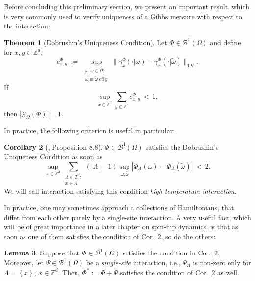 \documentclass[12pt]{article}
\newcommand{\BB}{\mathscr{B}}
\newcommand{\G}{\mathcal{G}}
\newcommand{\Z}{\mathbb{Z}}
\newcommand{\TV}{\mathrm{TV}}
\newcommand{\set}[1]{\left\{#1\right\}}
\newcommand{\pika}{\boldsymbol{\cdot}}
\newcommand{\1}{\mathbbm{1}}
\newcommand{\5}{\vspace{0.5cm}}
\renewcommand{\tilde}{\widetilde}
\theoremstyle{definition}
\newtheorem{thm}{Theorem}[section]
\newtheorem{lem}[thm]{Lemma}
\newtheorem{cor}[thm]{Corollary}
\begin{document}
Before concluding this preliminary section, we present an important result, which is very commonly used to verify uniqueness of a Gibbs measure with respect to the interaction:
\begin{thm}[Dobrushin's Uniqueness Condition]\label{Dobrushin}
Let $\Phi\in\BB^1(\Omega)$ and define for $x,y\in\Z^d$,
$$c_{x,y}^\Phi ~:=~ \sup_{\substack{\omega,\tilde{\omega}\in\Omega:\\\omega\equiv\tilde{\omega}~\text{off}~ y}}\|\gamma_x^\Phi(\pika|\omega)-\gamma_x^\Phi(\pika|\tilde{\omega})\|_\TV.$$
If
$$\sup_{x\in\Z^d}\sum_{y\in\Z^d}c_{x,y}^\Phi ~<~ 1,$$
then $|\G_\Omega(\Phi)|=1$.
\end{thm}

In practice, the following criterion is useful in particular:

\begin{cor}[\cite{Geo}, Proposition 8.8]\label{DobCor}
$\Phi\in\BB^1(\Omega)$ satisfies the Dobrushin's Uniqueness Condition as soon as
$$\sup_{x\in\Z^d}\sum_{\substack{\Lambda\Subset\Z^d:\\x\in\Lambda}}(|\Lambda|-1)\sup_{\omega,\tilde{\omega}}|\Phi_\Lambda(\omega)-\Phi_\Lambda(\tilde{\omega})| ~<~ 2.$$
We will call interaction satisfying this condition \textit{high-temperature interaction}.
\end{cor}

In practice, one may sometimes approach a collections of Hamiltonians, that differ from each other purely by a single-site interaction. A very useful fact, which will be of great importance in a later chapter on spin-flip dynamics, is that as soon as one of them satisfies the condition of Cor.~\ref{DobCor}, so do the others:
\begin{lem}\label{DobLem}
Suppose that $\Phi\in\BB^1(\Omega)$ satisfies the condition in Cor.~\ref{DobCor}. Moreover, let $\Psi\in\BB^1(\Omega)$ be a \textit{single-site} interaction, i.e., $\Psi_\Lambda$ is non-zero only for $\Lambda=\set{x}$, $x\in\Z^d$. Then, $\Phi^*:=\Phi+\Psi$ satisfies the condition of Cor.~\ref{DobCor} as well.
\end{lem}
\end{document}
